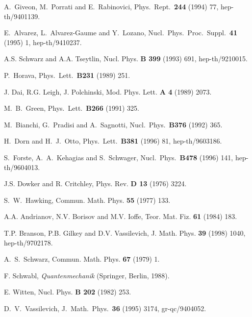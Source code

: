 \documentclass[a4paper,12pt]{article}
\begin{document}
\begin{thebibliography}{99}
A.~Giveon, M.~Porrati and E.~Rabinovici,
Phys.\ Rept.\  {\bf 244} (1994) 77, hep-th/9401139.

E.~Alvarez, L.~Alvarez-Gaume and Y.~Lozano,
Nucl.\ Phys.\ Proc.\ Suppl.\  {\bf 41} (1995) 1,  hep-th/9410237.

A.S. Schwarz and A.A. Tseytlin, Nucl. Phys. {\bf B 399} (1993)
691, hep-th/9210015.

P.~Horava,
Phys.\ Lett.\  {\bf B231} (1989) 251.

J. Dai, R.G. Leigh, J. Polchinski, Mod. Phys. Lett. {\bf A 4}
(1989) 2073.

M.~B.~Green,
Phys.\ Lett.\  {\bf B266} (1991) 325.

M.~Bianchi, G.~Pradisi and A.~Sagnotti,
Nucl.\ Phys.\  {\bf B376} (1992) 365.

H.~Dorn and H.~J.~Otto,
Phys.\ Lett.\  {\bf B381} (1996) 81, 
hep-th/9603186.

S.~Forste, A.~A.~Kehagias and S.~Schwager,
Nucl.\ Phys.\  {\bf B478} (1996) 141,
hep-th/9604013.

J.S. Dowker and R. Critchley, Phys. Rev. {\bf D 13} (1976) 3224.

S.~W.~Hawking, Commun. Math. Phys. {\bf 55} (1977) 133.

A.A. Andrianov, N.V. Borisov and M.V. Ioffe, Teor. Mat. Fiz.
{\bf 61} (1984) 183.

T.P. Branson, P.B. Gilkey and D.V. Vassilevich,
J. Math. Phys. {\bf 39} (1998) 1040, hep-th/9702178.      

A.~S.~Schwarz, Commun. Math. Phys. {\bf 67} (1979) 1.

F. Schwabl, {\it Quantenmechanik} (Springer, Berlin, 1988).

E. Witten, Nucl. Phys. {\bf B 202} (1982) 253.

D.~V.~Vassilevich,
J.\ Math.\ Phys.\  {\bf 36} (1995) 3174, gr-qc/9404052.  


\end{thebibliography}
\end{document}
